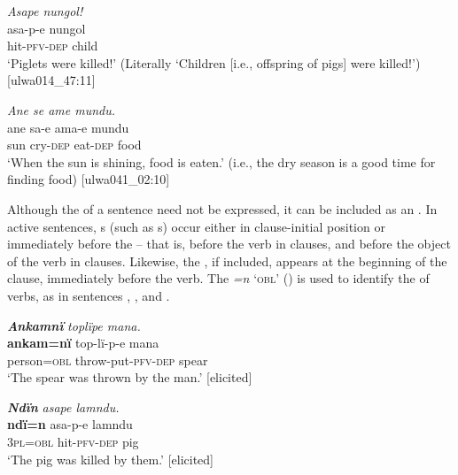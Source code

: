 \ea%
    \label{ex:syntax:280}
          \textit{Asape nungol!}\\
\gll    asa-p-e      nungol\\
    hit-\textsc{pfv-dep}  child\\
\glt `Piglets were killed!’ (Literally ‘Children [i.e., offspring of pigs] were killed!’) [ulwa014\_47:11]
\z

\ea%
    \label{ex:syntax:281}
          \textit{Ane se ame mundu.}\\
\gll    ane  sa-e    ama-e    mundu\\
    sun  cry-\textsc{dep}  eat-\textsc{dep}  food\\
\glt `When the sun is shining, food is eaten.’ (i.e., the dry season is a good time for finding   food) [ulwa041\_02:10]
\z



Although the  of a  sentence need not be expressed, it can be included as an  . In  active sentences, s (such as s) occur either in clause-initial position or immediately before the  -- that is, before the verb in  clauses, and before the object of the verb in  clauses. Likewise, the   , if included, appears at the beginning of the  clause, immediately before the verb. The  \textit{=n} ‘\textsc{obl}’ () is used to identify the  of  verbs, as in sentences , , and .

\ea%
    \label{ex:syntax:282}
          \textbf{\textit{Ankamnï}} \textit{toplïpe mana.}\\
\gll    \textbf{ankam=nï}    top-lï-p-e        mana\\
    person=\textsc{obl}  throw-put-\textsc{pfv-dep}  spear\\
\glt `The spear was thrown by the man.’ [elicited]
\z

\ea%
    \label{ex:syntax:283}
          \textbf{\textit{Ndïn}} \textit{asape lamndu.}\\
\gll    \textbf{ndï=n}    asa-p-e      lamndu\\
    3\textsc{pl=obl}  hit-\textsc{pfv-dep}  pig\\
\glt `The pig was killed by them.’ [elicited]
\z

